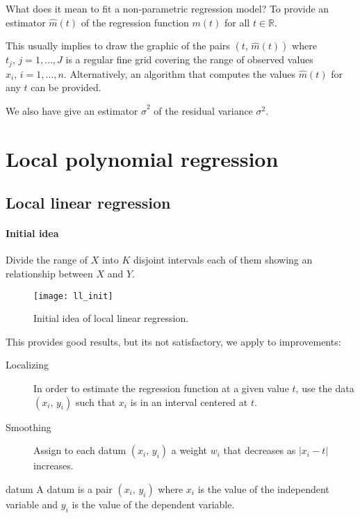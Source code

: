 \begin{question}{What does it mean to fit a non-parametric regression model?}{}
	To provide an estimator $\hat{m}(t)$ of the regression function $m(t)$ for
	all $t \in \mathbb{R}$.

	This usually implies to draw the graphic of the pairs $(t,\, \hat{m}(t))$ where
	$t_j,\, j=1,\ldots,J$ is a regular fine grid covering the range of observed values
	$x_i,\, i=1,\ldots,n$.
	Alternatively, an algorithm that computes the values $\hat{m}(t)$ for any $t$
	can be provided.

	We also have give an estimator $\hat\sigma^2$ of the residual variance $\sigma^2$.
\end{question}

\pagebreak
\section{Local polynomial regression}
\subsection{Local linear regression}

\paragraph{Initial idea} Divide the range of $X$ into $K$ disjoint intervals
each of them showing an  relationship between $X$ and $Y$.
\begin{figure}[H]
	\texttt{[image: ll\_init]}
	\caption{Initial idea of local linear regression.}
\end{figure}

This provides good results, but its not satisfactory, we apply to improvements:
\begin{description}
	\item[Localizing] In order to estimate the regression function at a given value $t$,
		use the data $(x_i,\, y_i)$ such that $x_i$ is in an interval centered at $t$.
	\item[Smoothing] Assign to each datum $(x_i,\, y_i)$ a weight $w_i$ that decreases
		as $|x_i - t|$ increases.
\end{description}

\begin{definition}{datum}{}
	A datum is a pair $(x_i,\, y_i)$ where $x_i$ is the value of the independent
	variable and $y_i$ is the value of the dependent variable.
\end{definition}

